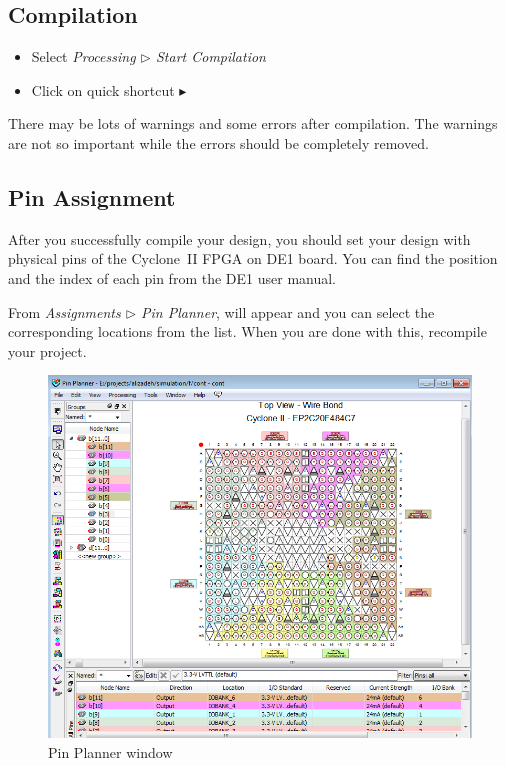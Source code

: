 \documentclass[12pt, logo=tehranDLDL/ut]{tehranDLDL}
\begin{document}
\begin{appendices}
\subsection{Compilation}

\begin{itemize}
    \item Select \textit{Processing $\rhd$ Start Compilation}
    \item Click on quick shortcut \textcolor[rgb]{0.3137254902,0,0.3137254902}{\Large$\blacktriangleright$}
\end{itemize}

There may be lots of warnings and some errors after compilation. The warnings are not so important while the errors should be completely removed.

\subsection{Pin Assignment}

After you successfully compile your design, you should set your design with physical pins of the Cyclone~II FPGA on DE1 board. You can find the position and the index of each pin from the DE1 user manual.

From \textit{Assignments $\rhd$ Pin Planner},  will appear and you can select the corresponding locations from the list. When you are done with this, recompile your project.

\begin{figure}
    \centering
    \caption{Pin Planner window\label{fig:pin_planner}}
    \includegraphics[width=\textwidth]{pin_assignment.png}
\end{figure}


\end{appendices}
\end{document}
